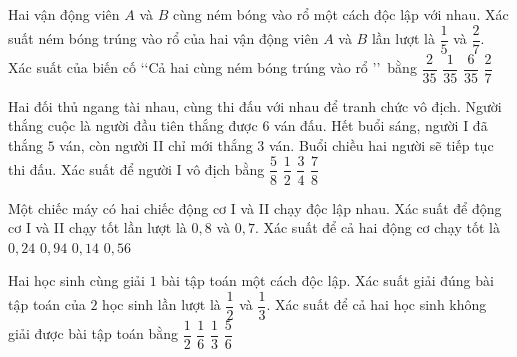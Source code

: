 \begin{ex}%
	Hai vận động viên $A$ và $B$ cùng ném bóng vào rổ một cách độc lập với nhau. Xác suất ném bóng trúng vào rổ của hai vận động viên $A$ và $B$ lần  lượt là $\dfrac{1}{5}$ và $\dfrac{2}{7}$. Xác suất của biến cố \lq\lq Cả hai cùng ném bóng trúng vào rổ \rq\rq \, bằng
	\choice 
		{\True  $\dfrac{2}{35}$}
		 {$\dfrac{1}{35}$}
		{$\dfrac{6}{35}$} 
		{$\dfrac{2}{7}$} 
\end{ex}

\begin{ex}%
	Hai đối thủ ngang tài nhau, cùng thi đấu với nhau để tranh chức vô địch. Người thắng cuộc là người đầu tiên thắng được $6$ ván đấu. Hết buổi sáng, người I đã thắng $5$ ván, còn người II chỉ mới thắng $3$ ván. Buổi chiều hai người sẽ tiếp tục thi đấu. Xác suất để người I vô địch  bằng
	\choice 
		 {$\dfrac{5}{8}$}
		{$\dfrac{1}{2}$} 
		 {$\dfrac{3}{4}$}
		{\True $\dfrac{7}{8}$} 
\end{ex}

\begin{ex}%
	Một chiếc máy có hai chiếc động cơ I và II chạy độc lập nhau. Xác suất để động cơ I và II chạy tốt lần lượt là $0{,}8$ và $0{,}7$. Xác suất để cả hai động cơ chạy tốt là 
	 \choice
		 {$0{,}24$}
		 {$0{,}94$}
		{$0{,}14$} 
		 {\True $0{,}56$}
\end{ex}

\begin{ex}%
	 Hai học sinh cùng giải $1$ bài tập toán một cách độc lập. Xác suất giải đúng bài tập toán của $2$ học sinh lần lượt là $\dfrac{1}{2}$ và $\dfrac{1}{3}$. Xác suất để cả hai học sinh không giải được bài tập toán bằng
	\choice 
		{$\dfrac{1}{2}$} 
		{$\dfrac{1}{6}$} 
		{\True  $\dfrac{1}{3}$}
		{$\dfrac{5}{6}$} 
\end{ex}

